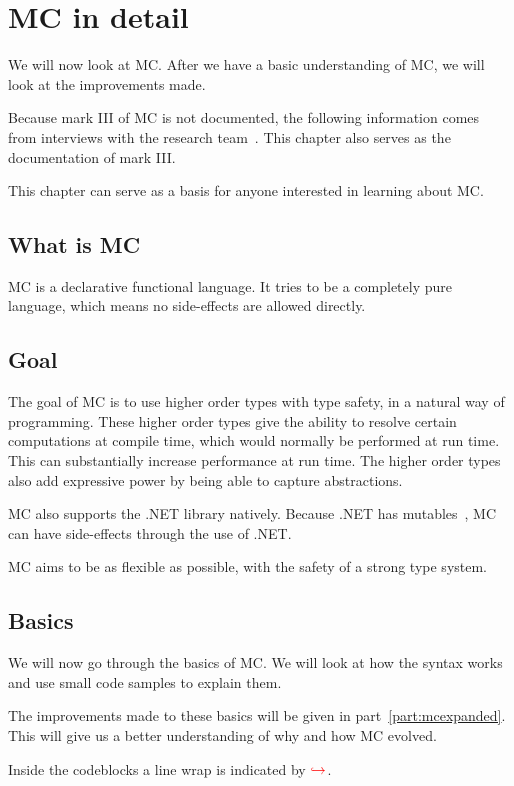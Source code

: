 \chapter{MC in detail}\label{chap:basicmc}
We will now look at MC.
After we have a basic understanding of MC, we will look at the improvements made.

Because mark III of MC is not documented, the following information comes from interviews with the research team~\cite{researchteaminterview}.
This chapter also serves as the documentation of mark III.

This chapter can serve as a basis for anyone interested in learning about MC.


\section{What is MC}
MC is a declarative functional language.
It tries to be a completely pure language, which means no side-effects are allowed directly.


\section{Goal}
The goal of MC is to use higher order types with type safety, in a natural way of programming.
These higher order types give the ability to resolve certain computations at compile time, which would normally be performed at run time.
This can substantially increase performance at run time.
The higher order types also add expressive power by being able to capture abstractions.

MC also supports the .NET library natively.
Because .NET has mutables~\cite{dotnetdescription}, MC can have side-effects through the use of .NET.

MC aims to be as flexible as possible, with the safety of a strong type system.


\section{Basics}
We will now go through the basics of MC.
We will look at how the syntax works and use small code samples to explain them.

The improvements made to these basics will be given in part~\ref{part:mcexpanded}.
This will give us a better understanding of why and how MC evolved.

Inside the codeblocks a line wrap is indicated by \ensuremath{\color{red}\hookrightarrow\space}.


